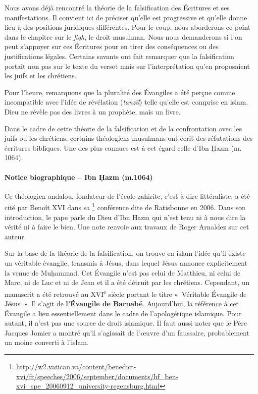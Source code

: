 Nous avons déjà rencontré la théorie de la falsification des Écritures
et ses manifestations. Il convient ici de préciser qu'elle est
progressive et qu'elle donne lieu à des positions juridiques
différentes. Pour le coup, nous aborderons ce point dans le chapitre sur
le \emph{fiqh}, le droit musulman. Nous nous demanderons si l'on peut
s'appuyer sur ces Écritures pour en tirer des conséquences ou des
justifications légales. Certains savants ont fait remarquer que la
falsification portait non pas sur le texte du verset mais sur
l'interprétation qu'en proposaient les juifs et les chrétiens.

Pour l'heure, remarquons que la pluralité des Évangiles a été perçue
comme incompatible avec l'idée de révélation (\emph{tanzīl}) telle
qu'elle est comprise en islam. Dieu ne révèle pas des livres à un
prophète, mais un livre.

Dans le cadre de cette théorie de la falsification et de la
confrontation avec les juifs ou les chrétiens, certains théologiens
musulmans ont écrit des réfutations des écritures bibliques. Une des
plus connues est à cet égard celle d'Ibn Ḥazm (m. 1064).

\paragraph{Notice biographique -- Ibn Ḥazm (m.1064)}

Ce théologien andalou, fondateur de l'école ẓahirite, c'est-à-dire
littéraliste, a été cité par Benoît XVI dans sa
\footnote{\url{http://w2.vatican.va/content/benedict-xvi/fr/speeches/2006/september/documents/hf\_ben-xvi\_spe_20060912\_university-regensburg.html}}
{conférence
dite de Ratisbonne} en 2006. Dans son introduction, le pape parle du
Dieu d'Ibn Hazm qui n'est tenu ni à nous dire la vérité ni à faire le
bien. Une note renvoie aux travaux de Roger Arnaldez sur cet auteur.



Sur la base de la théorie de la falsification, on trouve en islam l'idée
qu'il existe un véritable évangile, transmis à Jésus, dans lequel Jésus
annonce explicitement la venue de Muḥammad. Cet Évangile n'est pas celui
de Matthieu, ni celui de Marc, ni de Luc et ni de Jean et il a été
détruit par les chrétiens. Cependant, un manuscrit a été retrouvé au
XVI\textsuperscript{e} siècle portant le titre «~Véritable Évangile de
Jésus~». Il s'agit de \textbf{l'Évangile de Barnabé}. Aujourd'hui, la
référence à cet Évangile a lieu essentiellement dans le cadre de
l'apologétique islamique. Pour autant, il n'est pas une source de droit
islamique. Il faut aussi noter que le Père Jacques Jomier a montré qu'il
s'agissait de l'œuvre d'un faussaire, probablement un moine converti à
l'islam.

